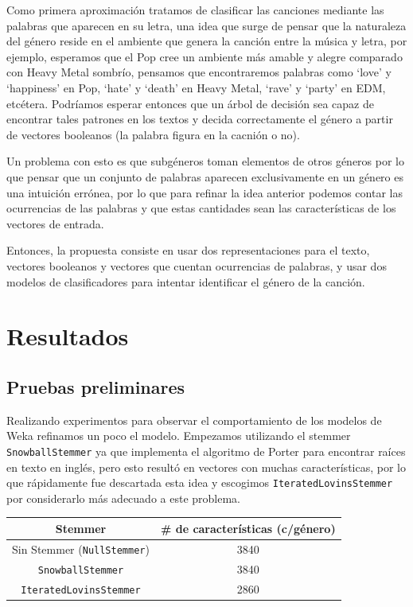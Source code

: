 \documentclass[spanish,11pt,letterpaper]{article}
\begin{document}
Como primera aproximación tratamos de clasificar las canciones mediante las
palabras que aparecen en su letra, una idea que surge de pensar que la
naturaleza del género reside en el ambiente que genera la canción entre la música
y letra, por ejemplo,
esperamos que el Pop cree un ambiente más amable y alegre comparado con Heavy
Metal sombrío, pensamos que encontraremos palabras como `love' y `happiness' en Pop,
`hate' y `death' en Heavy Metal, `rave' y `party' en EDM, etcétera. Podríamos esperar
entonces que un árbol de decisión sea capaz de encontrar tales patrones en los
textos y decida correctamente el género a partir de vectores booleanos (la
palabra figura en la cacnión o no).

Un problema con esto es que subgéneros toman elementos de otros
géneros por lo que pensar
que un conjunto de palabras aparecen exclusivamente en un género es una intuición errónea,
por lo que para refinar la idea anterior podemos contar las ocurrencias de las palabras
y que estas cantidades sean las características de los vectores de entrada.

Entonces, la propuesta consiste en usar dos representaciones para el texto,
vectores booleanos y vectores que cuentan ocurrencias de palabras, y usar dos
modelos de clasificadores para intentar identificar el género de la canción.

\section{Resultados}

\subsection{Pruebas preliminares}

Realizando experimentos para observar el comportamiento de los modelos
de Weka refinamos un poco el modelo. Empezamos utilizando el stemmer
\texttt{SnowballStemmer} ya que implementa el algoritmo de Porter para encontrar
raíces en texto en inglés, pero esto resultó en vectores con muchas características,
por lo que rápidamente fue descartada esta idea y escogimos
\texttt{IteratedLovinsStemmer} por considerarlo más adecuado a este problema.

\begin{center}
\begin{tabular}{c | c}
Stemmer &  \# de características (c/género)\\
\hline
Sin Stemmer (\texttt{NullStemmer}) & 3840\\
\texttt{SnowballStemmer} & 3840\\
\texttt{IteratedLovinsStemmer} & 2860
\end{tabular}
\end{center}
\end{document}
